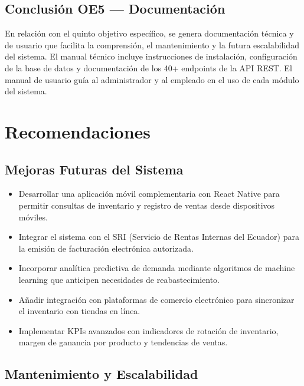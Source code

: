 \documentclass[12pt, letterpaper]{report}
\begin{document}
\section{Conclusión OE5 --- Documentación}

En relación con el quinto objetivo específico, se genera documentación técnica y de usuario que facilita la comprensión, el mantenimiento y la futura escalabilidad del sistema. El manual técnico incluye instrucciones de instalación, configuración de la base de datos y documentación de los 40+ endpoints de la API REST. El manual de usuario guía al administrador y al empleado en el uso de cada módulo del sistema.


\chapter{Recomendaciones}

\section{Mejoras Futuras del Sistema}

\begin{itemize}
    \item Desarrollar una aplicación móvil complementaria con React Native para permitir consultas de inventario y registro de ventas desde dispositivos móviles.
    \item Integrar el sistema con el SRI (Servicio de Rentas Internas del Ecuador) para la emisión de facturación electrónica autorizada.
    \item Incorporar analítica predictiva de demanda mediante algoritmos de machine learning que anticipen necesidades de reabastecimiento.
    \item Añadir integración con plataformas de comercio electrónico para sincronizar el inventario con tiendas en línea.
    \item Implementar KPIs avanzados con indicadores de rotación de inventario, margen de ganancia por producto y tendencias de ventas.
\end{itemize}

\section{Mantenimiento y Escalabilidad}
\end{document}
